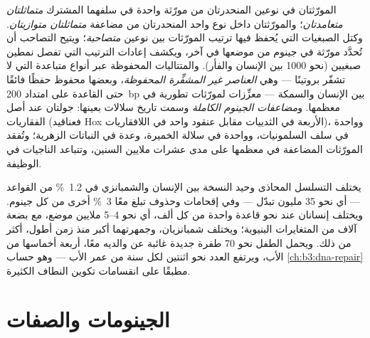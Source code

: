 \begin{definition}\label{def:b3:genomics:comparative}
المورّثتان في نوعين المنحدرتان من مورّثة واحدة في سلفهما المشترك
\emph{متماثلتان متعامدتان}؛ والمورّثتان داخل نوع واحد المنحدرتان من
مضاعفة \emph{متماثلتان متوازيتان}. وكتل الصبغيات التي يُحفظ فيها
ترتيب المورّثات بين نوعين \emph{متصاحبة}؛ ويتيح التصاحب أن
تُحدَّد مورّثة في جينوم من موضعها في آخر، ويكشف
إعادات الترتيب التي تفصل نمطين صبغيين (نحو \num{1000}
بين الإنسان والفأر). والمتتاليات المحفوظة عبر أنواع متباعدة
التي لا تشفّر بروتينًا --- وهي \emph{العناصر غير المشفِّرة المحفوظة}،
وبعضها محفوظ حفظًا فائقًا حتى القاعدة على امتداد \qty{200}{bp} بين الإنسان
والسمكة --- معزِّزات لمورّثات تطورية في معظمها. و\emph{مضاعفات
الجينوم الكاملة} وسمت تاريخ سلالات بعينها: جولتان عند
أصل الفقاريات (فعناقيد Hox الأربعة في الثدييات مقابل عنقود واحد
في اللافقاريات)، وواحدة في سلف السلمونيات، وواحدة في سلالة
الخميرة، وعدة في النباتات الزهرية؛ وتُفقد المورّثات المضاعفة في
معظمها على مدى عشرات ملايين السنين، وتتباعد الناجيات في
الوظيفة.
\end{definition}

\begin{example}\label{ex:b3:genomics:chimp}
يختلف التسلسل المحاذى وحيد النسخة بين الإنسان والشمبانزي في
\qty{1.2}{\%} من القواعد --- أي نحو \num{35} مليون تبدّل --- وفي
إقحامات وحذوف تبلغ معًا \qty{3}{\%} أخرى من كل
جينوم. ويختلف إنسانان عند نحو قاعدة واحدة من كل
ألف، أي نحو \numrange{4}{5} ملايين موضع، مع بضعة آلاف من
المتغايرات البنيوية؛ ويختلف شمبانزيان، وجمهرتهما أكبر منذ
زمن أطول، أكثر من ذلك. ويحمل الطفل نحو \num{70} طفرة
جديدة غائبة عن والديه معًا، أربعة أخماسها من
الأب، ويرتفع العدد نحو اثنتين لكل سنة من عمر الأب ---
وهو حساب \cref{ch:b3:dna-repair} مطبقًا على انقسامات
تكوين النطاف الكثيرة.
\end{example}

\section{الجينومات والصفات}

